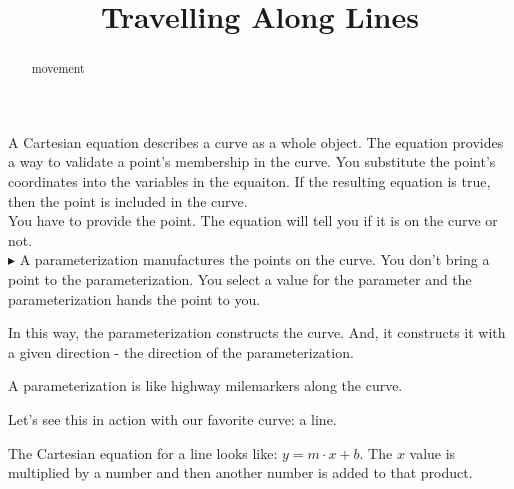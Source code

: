 \documentclass{ximera}
\title{Travelling Along Lines}
\begin{document}
\begin{abstract}
movement
\end{abstract}
\maketitle



A Cartesian equation describes a curve as a whole object.  The equation provides a way to validate a point's membership in the curve. You substitute the point's coordinates into the variables in the equaiton.  If the resulting equation is true, then the point is included in the curve. \\

You have to provide the point.  The equation will tell you if it is on the curve or not. \\






$\blacktriangleright$  A parameterization manufactures the points on the curve.  You don't bring a point to the parameterization.  You select a value for the parameter and the parameterization hands the point to you.

In this way, the parameterization constructs the curve.  And, it constructs it with a given direction - the direction of the parameterization.


A parameterization is like highway milemarkers along the curve.




Let's see this in action with our favorite curve: a line.




The Cartesian equation for a line looks like: $y = m \cdot x + b$.  The $x$ value is multiplied by a number and then another number is added to that product.
\end{document}
